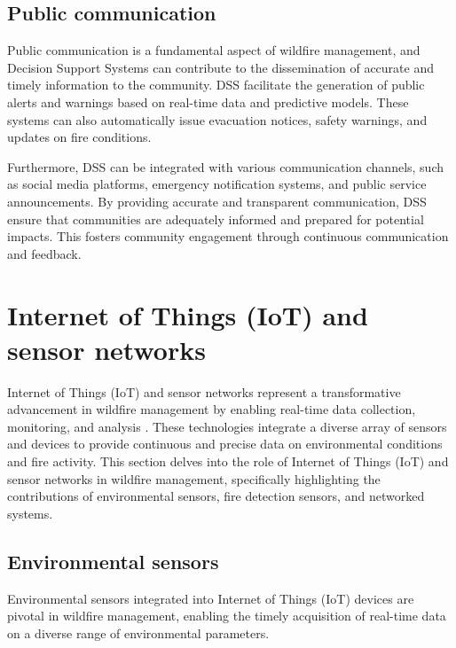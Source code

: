 \documentclass[
  12 pt,
]{Nemilov}
\begin{document}
\subsection{Public communication}\label{public-communication}

Public communication is a fundamental aspect of wildfire management, and Decision Support Systems can contribute to the dissemination of accurate and timely information to the community. DSS facilitate the generation of public alerts and warnings based on real-time data and predictive models. These systems can also automatically issue evacuation notices, safety warnings, and updates on fire conditions.

Furthermore, DSS can be integrated with various communication channels, such as social media platforms, emergency notification systems, and public service announcements. By providing accurate and transparent communication, DSS ensure that communities are adequately informed and prepared for potential impacts. This fosters community engagement through continuous communication and feedback.

\section{Internet of Things (IoT) and sensor networks}\label{internet-of-things-iot-and-sensor-networks}

Internet of Things (IoT) and sensor networks represent a transformative advancement in wildfire management by enabling real-time data collection, monitoring, and analysis \citep{giannakidou2024leveraging}. These technologies integrate a diverse array of sensors and devices to provide continuous and precise data on environmental conditions and fire activity. This section delves into the role of Internet of Things (IoT) and sensor networks in wildfire management, specifically highlighting the contributions of environmental sensors, fire detection sensors, and networked systems.

\subsection{Environmental sensors}\label{environmental-sensors}

Environmental sensors integrated into Internet of Things (IoT) devices are pivotal in wildfire management, enabling the timely acquisition of real-time data on a diverse range of environmental parameters.
\end{document}
